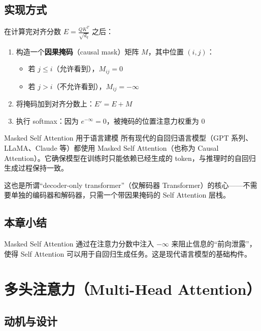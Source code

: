 \documentclass[a4paper]{article}
\begin{document}
\subsection{实现方式}

在计算完对齐分数 $E = \frac{QK^T}{\sqrt{d_q}}$ 之后：

\begin{enumerate}
    \item 构造一个\textbf{因果掩码}（causal mask）矩阵 $M$，其中位置 $(i,j)$：
    \begin{itemize}
        \item 若 $j \leq i$（允许看到），$M_{ij} = 0$
        \item 若 $j > i$（不允许看到），$M_{ij} = -\infty$
    \end{itemize}
    \item 将掩码加到对齐分数上：$E' = E + M$
    \item 执行 softmax：因为 $e^{-\infty} = 0$，被掩码的位置注意力权重为 0
\end{enumerate}

\begin{importantbox}{Masked Self Attention 用于语言建模}
所有现代的自回归语言模型（GPT 系列、LLaMA、Claude 等）都使用 Masked Self Attention（也称为 Causal Attention）。它确保模型在训练时只能依赖已经生成的 token，与推理时的自回归生成过程保持一致。

这也是所谓``decoder-only transformer''（仅解码器 Transformer）的核心——不需要单独的编码器和解码器，只需一个带因果掩码的 Self Attention 层栈。
\end{importantbox}

\subsection{本章小结}

Masked Self Attention 通过在注意力分数中注入 $-\infty$ 来阻止信息的``前向泄露''，使得 Self Attention 可以用于自回归生成任务。这是现代语言模型的基础构件。


\section{多头注意力（Multi-Head Attention）}

\subsection{动机与设计}
\end{document}
